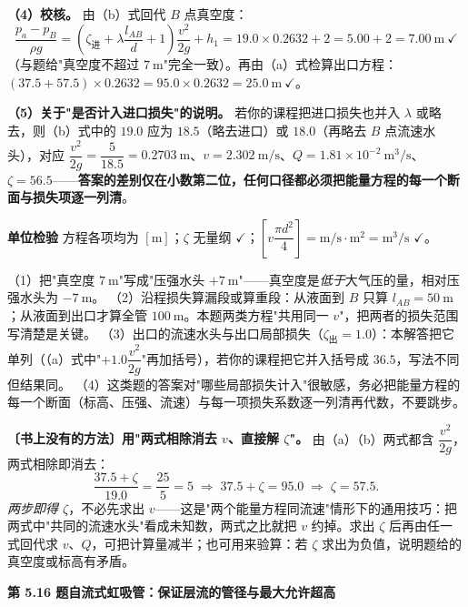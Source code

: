 \begin{jie}
\textbf{（4）校核。} 由（b）式回代 $B$ 点真空度：
\[\frac{p_a-p_B}{\rho g}=\left(\zeta_{\text{进}}+\lambda\frac{l_{AB}}{d}+1\right)\frac{v^2}{2g}+h_1=19.0\times0.2632+2=5.00+2=7.00\ \mathrm{m}\ \checkmark\]
（与题给"真空度不超过 $7\ \mathrm{m}$"完全一致）。再由（a）式检算出口方程：$\left(37.5+57.5\right)\times0.2632=95.0\times0.2632=25.0\ \mathrm{m}\ \checkmark$。

\textbf{（5）关于"是否计入进口损失"的说明。} 若你的课程把进口损失也并入 $\lambda$ 或略去，则（b）式中的 $19.0$ 应为 $18.5$（略去进口）或 $18.0$（再略去 $B$ 点流速水头），对应 $\dfrac{v^2}{2g}=\dfrac{5}{18.5}=0.2703\ \mathrm{m}$、$v=2.302\ \mathrm{m/s}$、$Q=1.81\times10^{-2}\ \mathrm{m^3/s}$、$\zeta=56.5$——\textbf{答案的差别仅在小数第二位，任何口径都必须把能量方程的每一个断面与损失项逐一列清}。

\textbf{单位检验} 方程各项均为 $[\mathrm{m}]$；$\zeta$ 无量纲 $\checkmark$；$\left[v\dfrac{\pi d^2}{4}\right]=\mathrm{m/s}\cdot\mathrm{m^2}=\mathrm{m^3/s}$ $\checkmark$。
\end{jie}
\begin{yicuo}
（1）把"真空度 $7\ \mathrm{m}$"写成"压强水头 $+7\ \mathrm{m}$"——真空度是\emph{低于}大气压的量，相对压强水头为 $-7\ \mathrm{m}$。
（2）沿程损失算漏段或算重段：从液面到 $B$ 只算 $l_{AB}=50\ \mathrm{m}$；从液面到出口才算全管 $100\ \mathrm{m}$。本题两类方程"共用同一 $v$"，把两者的损失范围写清楚是关键。
（3）出口的流速水头与出口局部损失（$\zeta_{\text{出}}=1.0$）：本解答把它单列（（a）式中"$+1.0\dfrac{v^2}{2g}$"再加括号），若你的课程把它并入括号成 $36.5$，写法不同但结果同。
（4）这类题的答案对"哪些局部损失计入"很敏感，务必把能量方程的每一个断面（标高、压强、流速）与每一项损失系数逐一列清再代数，不要跳步。
\end{yicuo}
\begin{banfa}
\textbf{〔书上没有的方法〕用"两式相除消去 $v$、直接解 $\zeta$"。} 由（a）（b）两式都含 $\dfrac{v^2}{2g}$，两式相除即消去：
\[\frac{37.5+\zeta}{19.0}=\frac{25}{5}=5\;\Longrightarrow\;37.5+\zeta=95.0\;\Longrightarrow\;\zeta=57.5.\]
\emph{两步即得 $\zeta$}，不必先求出 $v$——这是"两个能量方程同流速"情形下的通用技巧：把两式中"共同的流速水头"看成未知数，两式之比就把 $v$ 约掉。求出 $\zeta$ 后再由任一式回代求 $v$、$Q$，可把计算量减半；也可用来验算：若 $\zeta$ 求出为负值，说明题给的真空度或标高有矛盾。
\end{banfa}

\noindent\textbf{第 5.16 题\quad 自流式虹吸管：保证层流的管径与最大允许超高}

